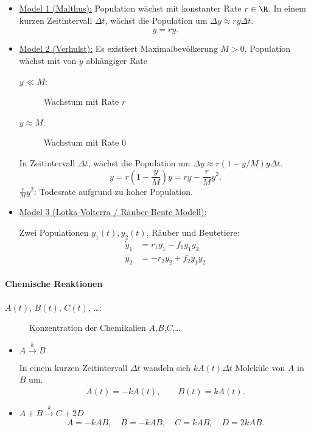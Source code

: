 \documentclass[
]{mycourse}
\theoremstyle{mythm}
\theoremstyle{break}
\begin{document}
\begin{itemize}
\item \underline{Model 1 (Malthus):} Population wächst mit konstanter Rate $r\in \R$. 
In einem kurzen Zeitintervall $\Delta t$, wächst die Population um $\Delta y \approx r y \Delta t$.
\[
\dot y=r y.
\]

\item \underline{Model 2 (Verhulst):} Es existiert Maximalbevölkerung $M>0$, Population wächst mit von $y$ abhängiger Rate
\begin{description}
\item[$y\ll M $:] Wachstum mit Rate $r$
\item[$y\approx M$:] Wachstum mit Rate $0$
\end{description}
In Zeitintervall $\Delta t$, wächst die Population um $\Delta y \approx r (1-y/M) y \Delta t$.
\[
\dot y=r\left( 1- \frac{y}{M} \right) y=r y - \frac{r}{M} y^2.
\]
$\frac{r}{M} y^2$: Todesrate aufgrund zu hoher Population.
%
\item \underline{Model 3 (Lotka-Volterra / Räuber-Beute Modell):}

Zwei Populationen $y_1(t), y_2(t)$, Räuber und Beutetiere:
\begin{align*}
\dot y_1 &= r_1 y_1 - f_1 y_1 y_2\\
\dot y_2 &= - r_2 y_2  + f_2 y_1 y_2
\end{align*}
\end{itemize}
%
\paragraph{Chemische Reaktionen}

\begin{description}
\item[$A(t)$, $B(t)$, $C(t)$, \ldots:] Konzentration der Chemikalien $A$,$B$,$C$,\ldots 
\end{description}

\begin{itemize}
\item $A \stackrel{k}{\longrightarrow} B$

In einem kurzen Zeitintervall $\Delta t$ wandeln sich $kA(t) \Delta t$ Moleküle von $A$ in $B$ um.
\[
\dot A(t)=-kA(t), \qquad \dot B(t)=kA(t).
\]

\item $A  + B \stackrel{k}{\longrightarrow} C + 2D$
\[
\dot A=-kA B, \quad \dot B=-kAB, \quad \dot C=kAB, \quad \dot D=2kAB.
\]
\end{itemize}
%
\end{document}
